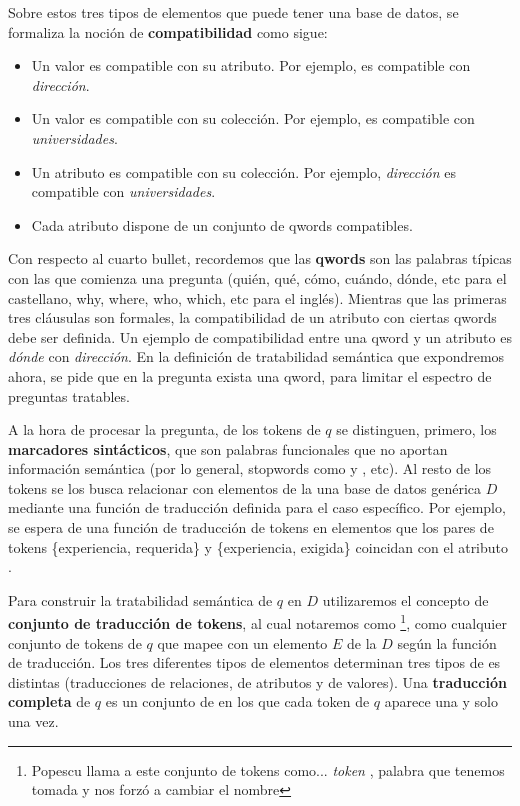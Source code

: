 Sobre estos tres tipos de elementos que puede tener una base de datos, se formaliza la noción de \textbf{compatibilidad} como sigue: 
\begin{itemize}
  \item Un valor es compatible con su atributo. Por ejemplo,  es compatible con \textit{dirección}. 
  \item Un valor es compatible con su colección. Por ejemplo,  es compatible con \textit{universidades}.
  \item Un atributo es compatible con su colección. Por ejemplo, \textit{dirección} es compatible con \textit{universidades}.
  \item Cada atributo dispone de un conjunto de qwords compatibles.
\end{itemize}

Con respecto al cuarto bullet, recordemos que las \textbf{qwords} son las palabras típicas con las que comienza una pregunta (quién, qué, cómo, cuándo, dónde, etc para el castellano, why, where, who, which, etc para el inglés). Mientras que las primeras tres cláusulas son formales, la compatibilidad de un atributo con ciertas qwords debe ser definida. Un ejemplo de compatibilidad entre una qword y un atributo es \textit{dónde} con \textit{dirección}. En la definición de tratabilidad semántica que expondremos ahora, se pide que en la pregunta exista una qword, para limitar el espectro de preguntas tratables. 


A la hora de procesar la pregunta, de los tokens de $q$ se distinguen, primero, los \textbf{marcadores sintácticos}, que son palabras funcionales que no aportan información semántica (por lo general, stopwords como  y , etc). Al resto de los tokens se los busca relacionar con elementos de la una base de datos genérica $D$ mediante una función de traducción definida para el caso específico. Por ejemplo, se espera de una función de traducción de tokens en elementos que los pares de tokens \{experiencia, requerida\} y \{experiencia, exigida\} coincidan con el atributo . 

Para construir la tratabilidad semántica de $q$ en $D$ utilizaremos el concepto de \textbf{conjunto de traducción de tokens}, al cual notaremos como \tradqd \footnote{Popescu llama a este conjunto de tokens como... \textit{token} , palabra que tenemos tomada y nos forzó a cambiar el nombre}, como cualquier conjunto de tokens de $q$ que mapee con un elemento $E$ de la $D$ según la función de traducción. Los tres diferentes tipos de elementos determinan tres tipos de \tradqd es distintas (traducciones de relaciones, de atributos y de valores). Una \textbf{traducción completa} de $q$ es un conjunto de \tradqd  en los que cada token de $q$ aparece una y solo una vez. 

